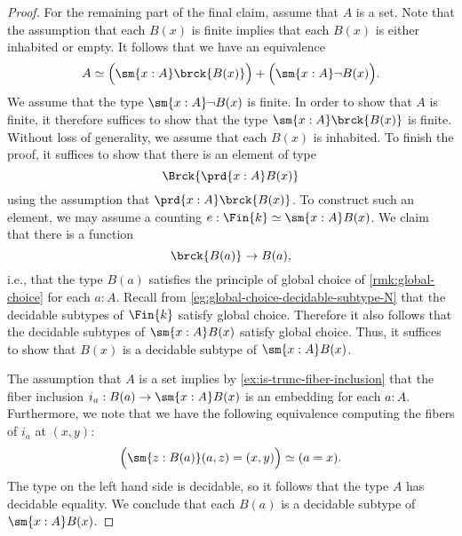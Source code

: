 \begin{proof}
  For the remaining part of the final claim, assume that $A$ is a set. Note that the assumption that each $B(x)$ is finite implies that each $B(x)$ is either inhabited or empty. It follows that we have an equivalence
  \begin{equation*}
    A\simeq \Big(\sm{x:A}\brck{B(x)}\Big)+\Big(\sm{x:A}\neg B(x)\Big).
  \end{equation*}
  We assume that the type $\sm{x:A}\neg B(x)$ is finite. In order to show that $A$ is finite, it therefore suffices to show that the type $\sm{x:A}\brck{B(x)}$ is finite. Without loss of generality, we assume that each $B(x)$ is inhabited. To finish the proof, it suffices to show that there is an element of type
  \begin{equation*}
    \Brck{\prd{x:A}B(x)}
  \end{equation*}
  using the assumption that $\prd{x:A}\brck{B(x)}$. To construct such an element, we may assume a counting $e:\Fin{k}\simeq\sm{x:A}B(x)$. We claim that there is a function
  \begin{equation*}
    \brck{B(a)}\to B(a),
  \end{equation*}
  i.e., that the type $B(a)$ satisfies the principle of global choice of \cref{rmk:global-choice} for each $a:A$. Recall from \cref{eg:global-choice-decidable-subtype-N} that the decidable subtypes of $\Fin{k}$ satisfy global choice. Therefore it also follows that the decidable subtypes of $\sm{x:A}B(x)$ satisfy global choice. Thus, it suffices to show that $B(x)$ is a decidable subtype of $\sm{x:A}B(x)$.
  
   The assumption that $A$ is a set implies by \cref{ex:is-trunc-fiber-inclusion} that the fiber inclusion $i_a:B(a)\to\sm{x:A}B(x)$ is an embedding for each $a:A$. Furthermore, we note that we have the following equivalence computing the fibers of $i_a$ at $(x,y)$:
  \begin{equation*}
    \Big(\sm{z:B(a)}(a,z)=(x,y)\Big)\simeq (a=x).
  \end{equation*}
  The type on the left hand side is decidable, so it follows that the type $A$ has decidable equality. We conclude that each $B(a)$ is a decidable subtype of $\sm{x:A}B(x)$.
\end{proof}

